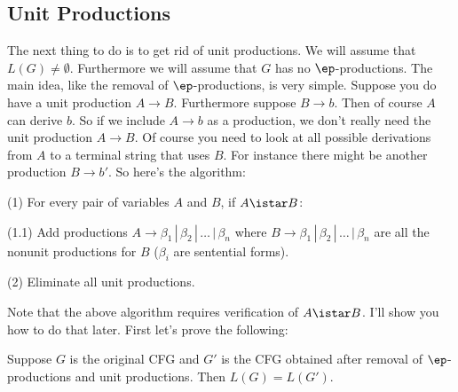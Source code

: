 \newpage
\subsection{Unit Productions}

The next thing to do is to get rid of unit productions. We will
assume that $L(G) \neq \emptyset$. Furthermore we will assume that
$G$ has no $\ep$-productions. The main idea, like the removal of
$\ep$-productions, is very simple. Suppose you do have a unit
production $A \rightarrow B$. Furthermore suppose $B \rightarrow
b$. Then of course $A$ can derive $b$. So if we include $A
\rightarrow b$ as a production, we don't really need the unit
production $A \rightarrow B$. Of course you need to look at all
possible derivations from $A$ to a terminal string that uses $B$.
For instance there might be another production $B \rightarrow b'$.
So here's the algorithm:

\begin{mylist}
 \item[(1)] For every pair of variables $A$ and $B$, if
 $A \istar B$:
 \begin{mylist}
  \item[(1.1)] Add productions $A \rightarrow \beta_1 \,|\, \beta_2 \,|\,
  \ldots \,|\, \beta_n$ where $B \rightarrow \beta_1 \,|\, \beta_2 \,|\,
  \ldots \,|\, \beta_n$ are all the nonunit productions for $B$
  ($\beta_i$ are sentential forms).
 \end{mylist}
 \item[(2)] Eliminate all unit productions.
\end{mylist}

Note that the above algorithm requires verification of $A \istar
B$. I'll show you how to do that later. First let's prove the
following:

\begin{thm}
Suppose $G$ is the original CFG and $G'$ is the CFG obtained after
removal of $\ep$-productions and unit productions. Then $L(G) =
L(G')$.
\end{thm}

